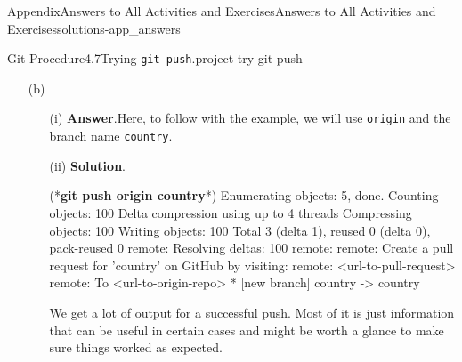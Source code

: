 \documentclass[twoside,10pt,]{book}
\newcommand{\blocktitlefont}{\relax}
\newcommand{\mono}[1]{\texttt{#1}}
\newcommand{\consoleinput}[1]{\textbf{#1}}
\begin{document}
\begin{solutions-chapter}{Appendix}{Answers to All Activities and Exercises}{}{Answers to All Activities and Exercises}{}{}{solutions-app_answers}
\begin{projectsolution}{Git Procedure}{4.7}{Trying \mono{git push}.}{project-try-git-push}
\begin{enumerate}[font=\bfseries,label=(\alph*),ref=\alph*]
\begin{enumerate}[font=\bfseries,label=(\roman*),ref=\theenumi.\roman*]
\begin{console}{0}{1}{0}
    git push --set-upstream origin country
\end{console}
Well, look at that, the same error. This should make sense. You are telling Git to push changes to the origin repo but \mono{country}, the current branch, doesn't have an origin since we created the branch locally.%
\item[(iii)]\noindent\textbf{\blocktitlefont Solution}.\hypertarget{solution-try-git-push-c-d-b-back}{}\quad{}\begin{console}{0}{1}{0}
(*\consoleinput{git push country}*)
fatal: 'country' does not appear to be a git repository
fatal: Could not read from remote repository.

Please make sure you have the correct access rights
and the repository exists.
\end{console}
Remember the four parts to \mono{git push}? Well since we forgot Step 3, the remote name, Git assumes that the word ``country'' is the name of the repo we want to push to. Since there is no repo named ``country'' on your computer nor on GitHub, it doens't know where to push and errors out.%
\end{enumerate}%
\item[(b)]\begin{enumerate}[font=\bfseries,label=(\roman*),ref=\theenumi.\roman*]%
\item[(i)]\noindent\textbf{\blocktitlefont Answer}.\hypertarget{answer-try-git-push-d-b-b-back}{}\quad{}Here, to follow with the example, we will use \mono{origin} and the branch name \mono{country}.%
\item[(ii)]\noindent\textbf{\blocktitlefont Solution}.\hypertarget{solution-try-git-push-d-c-b-back}{}\quad{}\begin{console}{0}{1}{0}
(*\consoleinput{git push origin country}*)
Enumerating objects: 5, done.
Counting objects: 100%
Delta compression using up to 4 threads
Compressing objects: 100%
Writing objects: 100%
Total 3 (delta 1), reused 0 (delta 0), pack-reused 0
remote: Resolving deltas: 100%
remote: 
remote: Create a pull request for 'country' on GitHub by visiting:
remote:      <url-to-pull-request>
remote: 
To <url-to-origin-repo>
 * [new branch]      country -> country
\end{console}
We get a lot of output for a successful push. Most of it is just information that can be useful in certain cases and might be worth a glance to make sure things worked as expected.%
\end{enumerate}%

\end{enumerate}
\end{projectsolution}
\end{solutions-chapter}
\end{document}
